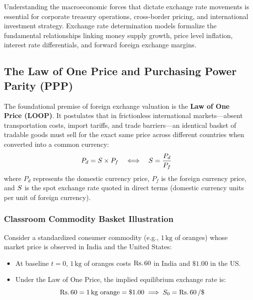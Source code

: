 Understanding the macroeconomic forces that dictate exchange rate movements is essential for corporate treasury operations, cross-border pricing, and international investment strategy. Exchange rate determination models formalize the fundamental relationships linking money supply growth, price level inflation, interest rate differentials, and forward foreign exchange margins.

\subsection{The Law of One Price and Purchasing Power Parity (PPP)}
The foundational premise of foreign exchange valuation is the \textbf{Law of One Price (LOOP)}. It postulates that in frictionless international markets---absent transportation costs, import tariffs, and trade barriers---an identical basket of tradable goods must sell for the exact same price across different countries when converted into a common currency:
\begin{equation}
    P_d = S \times P_f \quad \Longleftrightarrow \quad S = \frac{P_d}{P_f}
\end{equation}
where $P_d$ represents the domestic currency price, $P_f$ is the foreign currency price, and $S$ is the spot exchange rate quoted in direct terms (domestic currency units per unit of foreign currency).

\subsubsection{Classroom Commodity Basket Illustration}
Consider a standardized consumer commodity (e.g., $1\,\text{kg}$ of oranges) whose market price is observed in India and the United States:
\begin{itemize}[leftmargin=*, noitemsep]
    \item At baseline $t=0$, $1\,\text{kg}$ of oranges costs $\text{Rs.}\, 60$ in India and $\$1.00$ in the US.
    \item Under the Law of One Price, the implied equilibrium exchange rate is:
    \begin{equation*}
        \inr 60 = 1\,\text{kg orange} = \$1.00 \implies \Spot_0 = \inr 60\,/\$
    \end{equation*}
\end{itemize}

